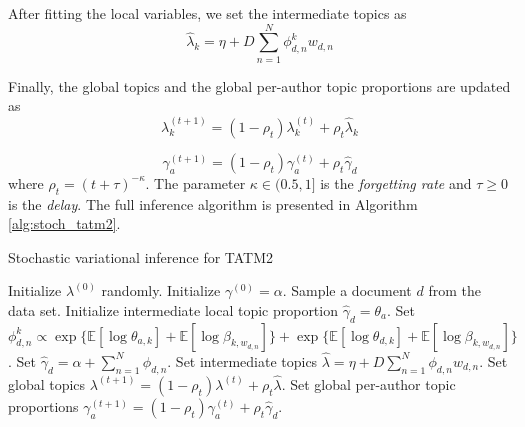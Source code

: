 After fitting the local variables, we set the intermediate topics as
\begin{equation}
\hat{\lambda}_k = \eta + D \sum_{n=1}^{N}{\phi^k_{d,n}w_{d,n}}
\end{equation}

Finally, the global topics and the global per-author topic proportions are updated as
\begin{equation}
\lambda^{(t+1)}_k = (1 - \rho_t) \lambda^{(t)}_k + \rho_t \hat{\lambda}_k
\end{equation}

\begin{equation}
\gamma^{(t+1)}_a = (1 - \rho_t) \gamma^{(t)}_a + \rho_t \hat{\gamma}_d
\end{equation}
%
where $\rho_t=(t + \tau)^{-\kappa}$. The parameter $\kappa\in(0.5,1]$ is the \textit{forgetting rate} and $\tau\geq0$ is the \textit{delay}. The full inference algorithm is presented in Algorithm \ref{alg:stoch_tatm2}.


\begin{algorithm}[tb]
\caption{Stochastic variational inference for TATM2}
\label{alg:stoch_tatm2}
\begin{algorithmic}[1]
	\STATE Initialize $\lambda^{(0)}$ randomly.
	\STATE Initialize $\gamma^{(0)} = \alpha$.
	\REPEAT
	\STATE Sample a document $d$ from the data set.
	\STATE Initialize intermediate local topic proportion $\hat{\gamma}_d = \theta_{a}$.
		\REPEAT
					\STATE Set $\phi^k_{d,n} \propto \exp \{ \mathbb{E}[\log \theta_{a,k}] + \mathbb{E}[\log \beta_{k,w_{d,n}}] \} + \exp \{ \mathbb{E}[\log \theta_{d,k}] + \mathbb{E}[\log \beta_{k,w_{d,n}}] \}$.
			\ENDFOR
			\STATE Set $\hat{\gamma}_d = \alpha + \sum_{n=1}^{N}{\phi_{d,n}}$.
		\STATE Set intermediate topics $\hat{\lambda} = \eta + D \sum_{n=1}^{N}{\phi_{d,n}w_{d,n}}$.
		\STATE Set global topics $\lambda^{(t+1)} = (1 - \rho_t) \lambda^{(t)} + \rho_t \hat{\lambda}$.
		\STATE Set global per-author topic proportions $\gamma^{(t+1)}_a = (1 - \rho_t) \gamma^{(t)}_a + \rho_t \hat{\gamma}_d$.
\end{algorithmic}
\end{algorithm}
